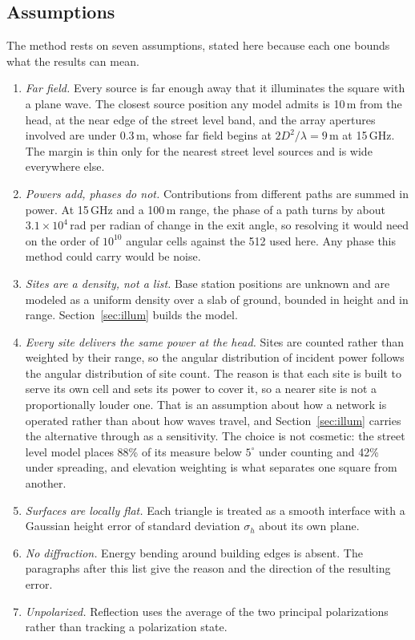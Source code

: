 \subsection{Assumptions}

The method rests on seven assumptions, stated here because each one bounds what
the results can mean.

\begin{enumerate}
  \item[A1] \emph{Far field.} Every source is far enough away that it
  illuminates the square with a plane wave. The closest source position any
  model admits is 10\,m from the head, at the near edge of the street level
  band, and the array apertures involved are under 0.3\,m, whose far field
  begins at $2D^2/\lambda = 9$\,m at 15\,GHz. The margin is thin only for the
  nearest street level sources and is wide everywhere else.
  \item[A2] \emph{Powers add, phases do not.} Contributions from different
  paths are summed in power. At 15\,GHz and a 100\,m range, the phase of a path
  turns by about $3.1 \times 10^{4}$\,rad per radian of change in the exit
  angle, so resolving it would need on the order of $10^{10}$ angular cells
  against the 512 used here. Any phase this method could carry would be noise.
  \item[A3] \emph{Sites are a density, not a list.} Base station positions are
  unknown and are modeled as a uniform density over a slab of ground, bounded
  in height and in range. Section~\ref{sec:illum} builds the model.
  \item[A4] \emph{Every site delivers the same power at the head.} Sites are
  counted rather than weighted by their range, so the angular distribution of
  incident power follows the angular distribution of site count. The reason is
  that each site is built to serve its own cell and sets its power to cover it,
  so a nearer site is not a proportionally louder one. That is an assumption
  about how a network is operated rather than about how waves travel, and
  Section~\ref{sec:illum} carries the alternative through as a sensitivity. The
  choice is not cosmetic: the street level
  model places 88\% of its measure below $5^\circ$ under counting and 42\%
  under spreading, and elevation weighting is what separates one square from
  another.
  \item[A5] \emph{Surfaces are locally flat.} Each triangle is treated as a
  smooth interface with a Gaussian height error of standard deviation
  $\sigma_h$ about its own plane.
  \item[A6] \emph{No diffraction.} Energy bending around building edges is
  absent. The paragraphs after this list give the reason and the
  direction of the resulting error.
  \item[A7] \emph{Unpolarized.} Reflection uses the average of the two
  principal polarizations rather than tracking a polarization state.
\end{enumerate}

